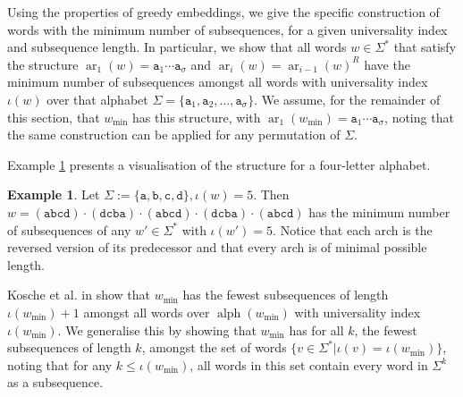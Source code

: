 \documentclass[10pt,a4paper]{amsart}
\def\ta{\mathtt{a}}
\def\tb{\mathtt{b}}
\def\tc{\mathtt{c}}
\def\td{\mathtt{d}}
\DeclareMathOperator{\arch}{ar}
\DeclareMathOperator{\alphabet}{alph}
\DeclareMathOperator\ScatFact{SubSeq}
\newif\ifpaper
\theoremstyle{plain}
\theoremstyle{definition}
\newtheorem{example}{Example}
\begin{document}
Using the properties of greedy embeddings, we give the specific construction of words with the minimum number of subsequences, for a given universality index and subsequence length. In particular, we show that all words $w\in\Sigma^*$ that satisfy the structure $\arch_1(w) = \ta_1 \cdots \ta_\sigma$ and $\arch_i(w) = \arch_{i-1}(w)^R$ have the minimum number of subsequences amongst all words with universality index $\iota(w)$ over that alphabet $\Sigma = \{ \ta_1, \ta_2, \dots , \ta_\sigma\}$. We assume, for the remainder of this section, that $w_{\min}$ has this structure, with $\arch_1(w_{\min}) = \ta_1 \cdots \ta_\sigma$, noting that the same construction can be applied for any permutation of $\Sigma$. 
\ifpaper
\else
Example \ref{example:minimal-existing-word-example} presents a visualisation of the structure for a four-letter alphabet.
\begin{example}\label{example:minimal-existing-word-example}
    Let $\Sigma := \{\ta,\tb,\tc,\td\}, \iota(w) = 5$. Then
    $w =( \ta\tb\tc\td) \cdot (\td\tc\tb\ta)\cdot (\ta\tb\tc\td)\cdot (\td\tc\tb\ta)\cdot (\ta\tb\tc\td)$
    has the minimum number of subsequences of any $w' \in \Sigma^*$ with $\iota(w') =5$.
    Notice that each arch is the reversed version of its predecessor and that every arch is of minimal possible length.
\end{example}
\fi
Kosche et al. in \cite{DBLP:journals/fuin/KoscheKMS22} show that $w_{\min}$ has the fewest subsequences of length $\iota(w_{\min}) + 1$ amongst all words over $\alphabet(w_{\min})$ with universality index $\iota(w_{\min})$. We generalise this by showing that $w_{\min}$ has for all $k$, the fewest subsequences of length $k$, amongst the set of words $\{v \in \Sigma^* \vert \iota(v) = \iota(w_{\min}) \}$, noting that for any $k \leq \iota(w_{\min})$, all words in this set contain every word in $\Sigma^k$ as a subsequence.
%
\end{document}
